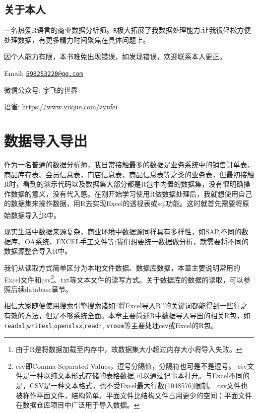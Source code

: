 \documentclass[
]{book}
\begin{document}
\hypertarget{author}{%
\section*{关于本人}\label{author}}

一名热爱R语言的商业数据分析师。\texttt{R}极大拓展了我数据处理能力,让我很轻松方便处理数据，有更多精力时间聚焦在具体问题上。

因个人能力有限，本书难免出现错误，如发现错误，欢迎联系本人更正。

Email: \href{mailto:598253220@qq.com}{\nolinkurl{598253220@qq.com}}

微信公众号: 宇飞的世界

语雀: \url{https://www.yuque.com/zyufei}

\hypertarget{data:read-write-description}{%
\chapter{数据导入导出}\label{data:read-write-description}}

作为一名普通的数据分析师，我日常接触最多的数据是业务系统中的销售订单表、商品库存表、会员信息表，门店信息表，商品信息表等之类的业务表，但最初接触R时，看到的演示代码以及数据集大部分都是R包中内置的数据集，没有很明确操作数据的意义，没有代入感。在刚开始学习使用R做数据处理后，我就想使用自己的数据集来操作数据，用R去实现Excel的透视表或sql功能。这时就首先需要将原始数据导入\footnote{由于R是将数据加载至内存中，故数据集大小超过内存大小将导入失败。}R中。

现实生活中数据来源复杂，商业环境中数据源同样具有多样性，如SAP,不同的数据库、OA系统、EXCEL手工文件等;我们想要统一数据做分析，就需要将不同的数据源整合导入R中。

我们从读取方式简单区分为本地文件数据、数据库数据，本章主要说明常用的Excel文件和csv\footnote{csv即Comma-Separated Values，逗号分隔值，分隔符也可是不是逗号。
  csv文件是一种以纯文本形式存储的表格数据,可以通过记事本打开。与Excel不同的是，CSV是一种文本格式，也不受Excel最大行数(1048576)限制。
  csv文件也被称作平面文件，结构简单，平面文件比结构文件占用更少的空间；平面文件在数据仓库项目中广泛用于导入数据。}、txt等文本文件的读写方式。关于数据库的数据的读取，可以参照后续database章节。

相信大家随便使用搜索引擎搜索诸如``将Excel导入R''的关键词都能得到一些行之有效的方法，但是不够系统全面。本章主要简述R中数据导入导出的相关R包，如\texttt{readxl},\texttt{writexl},\texttt{openxlsx},\texttt{readr}, \texttt{vroom}等主要处理csv或Excel的R包。
\end{document}
